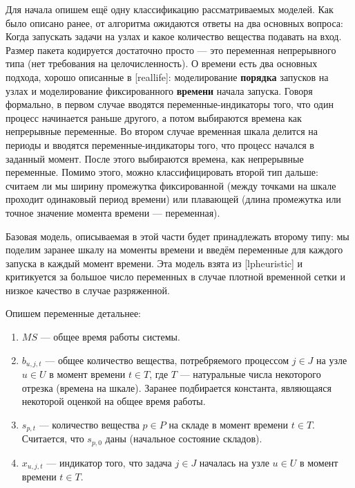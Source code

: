 \documentclass[12pt, twoside]{article}
\theoremstyle{definition}
\begin{document}
Для начала опишем ещё одну классификацию рассматриваемых моделей. Как было описано ранее, от алгоритма ожидаются ответы на два основных вопроса: Когда запускать задачи на узлах и какое количество вещества подавать на вход. Размер пакета кодируется достаточно просто --- это переменная непрерывного типа (нет требования на целочисленность). О времени есть два основных подхода, хорошо описанные в [reallife]: моделирование \textbf{порядка} запусков на узлах и моделирование фиксированного \textbf{времени} начала запуска. Говоря формально, в первом случае вводятся переменные-индикаторы того, что один процесс начинается раньше другого, а потом выбираются времена как непрерывные переменные. Во втором случае временная шкала делится на периоды и вводятся переменные-индикаторы того, что процесс начался в заданный момент. После этого выбираются времена, как непрерывные переменные. Помимо этого, можно классифицировать второй тип дальше: считаем ли мы ширину промежутка фиксированной (между точками на шкале проходит одинаковый период времени) или плавающей (длина промежутка или точное значение момента времени --- переменная).

Базовая модель, описываемая в этой части будет принадлежать второму типу: мы поделим заранее шкалу на моменты времени и введём переменные для каждого запуска в каждый момент времени. Эта модель взята из [lpheuristic] и критикуется за большое число переменных в случае плотной временной сетки и низкое качество в случае разряженной.

Опишем переменные детальнее: 

\begin{enumerate}

\item $MS$ --- общее время работы системы.
\item $b_{u,j,t}$ --- общее количество вещества, потребряемого процессом $j \in J$ на узле $u \in U$ в момент времени $t \in T$, где $T$ --- натуральные числа некоторого отрезка (времена на шкале). Заранее подбирается константа, являющаяся некоторой оценкой на общее время работы.
\item $s_{p, t}$ --- количество вещества $p \in P$ на складе в момент времени $t \in T$. Считается, что $s_{p, 0}$ даны (начальное состояние складов).
\item $x_{u, j, t}$ --- индикатор того, что задача $j \in J$ началась на узле $u \in U$ в момент времени $t \in T$.

\end{enumerate}
\end{document}
